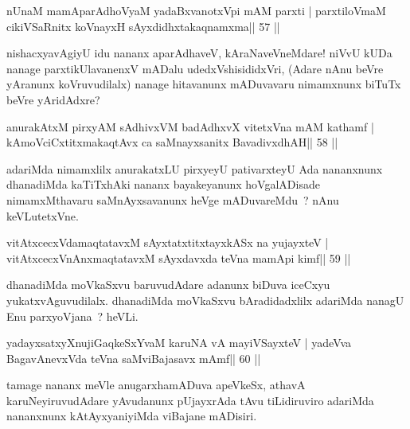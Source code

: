 \begin{shl}
nUnaM mamAparAdhoV\s yaM yadaBxvanotxV\s pi mAM parxti |
parxtiloVmaM cikiVSaRnitx koV\s nayxH sAyxdidhxtakaqnamxma\hfill || 57 ||
\end{shl}

\begin{artha}
nishacxyavAgiyU idu nananx aparAdhaveV, kAraNaveVneMdare! niVvU kUDa
nanage parxtikUlavanenxV mADalu udedxVshisididxVri, (Adare nAnu
beVre yAranunx koVruvudilalx) nanage hitavanunx mADuvavaru nimamxnunx
biTuTx beVre yAridAdxre?
\end{artha}

\begin{shl}
anurakAtxM pirxyAM sAdhivxVM badAdhxvX vitetxVna mAM kathamf |
kAmoVciCxtitxmakaqtAvx ca saMnayxsanitx BavadivxdhAH\hfill || 58 ||
\end{shl}

\begin{artha}
adariMda nimamxlilx anurakatxLU pirxyeyU pativarxteyU Ada nananxnunx dhanadiMda kaTiTxhAki nananx bayakeyanunx hoVgalADisade nimamxMthavaru saMnAyxsavanunx heVge mADuvareMdu~? nAnu keVLutetxVne.
\end{artha}

\begin{shl}
vitAtxcecxVdamaqtatavxM sAyxtatxtitxtayxkASx na yujayxteV |
vitAtxcecxVnAnxmaqtatavxM sAyxdavxda teVna mamApi kimf\hfill || 59 ||
\end{shl}

\begin{artha}
dhanadiMda moVkaSxvu baruvudAdare adanunx biDuva iceCxyu yukatxvAguvudilalx. dhanadiMda moVkaSxvu bAradidadxlilx adariMda nanagU Enu parxyoVjana~? heVLi.
\end{artha}

\begin{shl}
yadayxsatxyXnujiGaqkeSxYvaM karuNA vA mayiVSayxteV |
yadeVva BagavAnevxVda teVna saMviBajasavx mAmf\hfill || 60 ||
\end{shl}

\begin{artha}
tamage nananx meVle anugarxhamADuva apeVkeSx, athavA karuNeyiruvudAdare yAvudanunx pUjayxrAda tAvu tiLidiruviro adariMda nananxnunx kAtAyxyaniyiMda viBajane mADisiri.
\end{artha}


